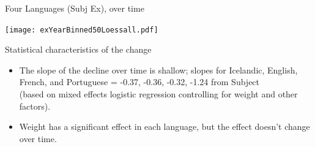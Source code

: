 \documentclass[hyperref={pdfpagelabels=false}]{beamer}
\begin{document}
\begin{frame}{Four Languages (Subj Ex), over time}

\begin{center}
\texttt{[image: exYearBinned50Loessall.pdf]}
\end{center}
\end{frame}

\begin{frame}{Statistical characteristics of the change}
    \begin{itemize}
    	\item The slope of the decline over time is shallow; slopes for Icelandic, English, French, and Portuguese = -0.37, -0.36, -0.32, -1.24 from Subject\\(based on mixed effects logistic regression controlling for weight and other factors).
	\item Weight has a significant effect in each language, but the effect doesn't change over time.
\end{itemize}
\end{frame}


\end{document}
